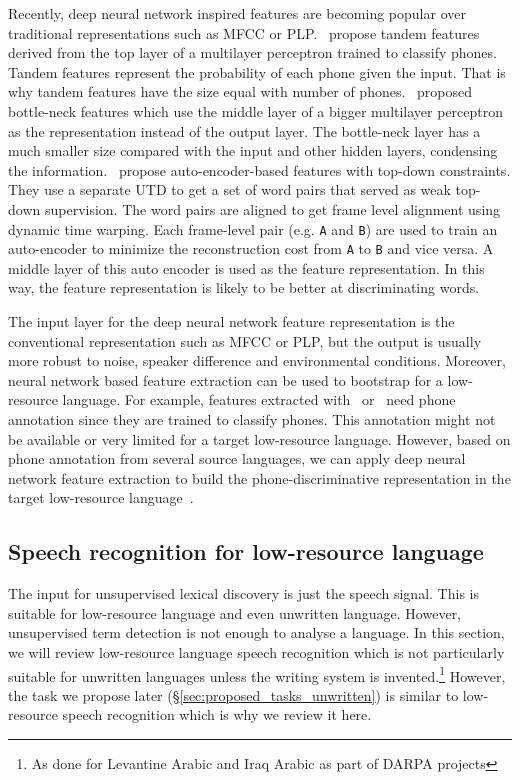 \documentclass[12pt,twoside,final,hidelinks]{ltthesis}
\theoremstyle{definition}
\begin{document}
Recently, deep neural network inspired features are becoming 
popular over traditional representations such as MFCC or PLP.~ propose tandem features derived from the top layer of a multilayer perceptron 
trained to classify phones. Tandem features represent the probability of each phone given the input. That is why tandem features have the size equal with number of  
phones.~ proposed bottle-neck features which use the middle layer of a bigger multilayer perceptron as the representation instead of the 
output layer. The bottle-neck layer has a much smaller size compared with the input and other hidden layers, condensing the information.~ propose auto-encoder-based features with top-down constraints. They use a separate UTD to get a set of word pairs that served as weak top-down supervision. 
The word pairs are aligned to get frame level alignment using dynamic time warping. Each frame-level pair (e.g. \texttt{A} and \texttt{B}) are used to train an 
auto-encoder to minimize the reconstruction cost from \texttt{A} to \texttt{B} and vice versa. A middle layer of this auto encoder is used as the feature representation. In this way, the feature representation is likely to be better at discriminating words. 

The input layer for the deep neural network feature representation is the conventional representation such as MFCC or PLP, but the output is usually more robust to noise, speaker difference and environmental conditions. Moreover, neural network based feature extraction can be used to bootstrap for a low-resource language. For example, features 
extracted with~ or~ need phone annotation since they are trained to classify phones. This annotation might not be available or very limited for a target low-resource language. However, based on phone annotation from several source languages, we can apply deep neural network feature extraction to build the phone-discriminative representation in the target low-resource language~\cite{Vesely12,Stolcke06Share,ThomasMLPfeatures12}. 

\subsection{Speech recognition for low-resource language}
The input for unsupervised lexical discovery is just the speech signal. This is suitable for low-resource language and even unwritten language. 
However, unsupervised term detection is not enough to analyse a language. In this section, we will review low-resource language speech recognition which is not particularly suitable for 
unwritten languages unless the writing system is invented.\footnote{As done for Levantine Arabic and Iraq Arabic as part of DARPA projects} However, the task we propose later (\S\ref{sec:proposed_tasks_unwritten}) is similar to low-resource speech recognition which is why we review it here. 
\end{document}
